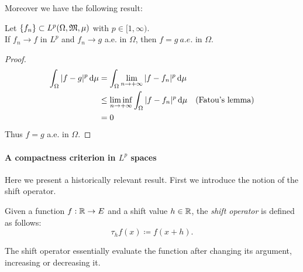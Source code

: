 Moreover we have the following result:

\begin{prop}
	Let $\{f_n\}\subset L^p(\Omega,\mathfrak M,\mu)$ with $p \in [1,\infty)$. \\
	If $f_n \to f$ in $L^p$ and $f_n \to g$ a.e. in $\Omega$, then $f=g \ a.e.$ in $\Omega$.
\end{prop}

\begin{proof}
	\begin{align*}
	\int_\Omega |f-g|^p \, \mathrm d \mu
	&= \int_\Omega \lim\limits_{n\to+\infty}|f-f_n|^p \,\mathrm d \mu\\ 
	&\leq \liminf_{n \to +\infty}\int_\Omega |f-f_n|^p \,\mathrm d \mu & \text{(Fatou's lemma)}\\
	& = 0
	\end{align*}
	Thus $f=g$ a.e. in $\Omega$.
\end{proof}


\paragraph{A compactness criterion in $L^p$ spaces} Here we present a historically relevant result. First we introduce the notion of the shift operator.

\begin{defn}
	Given a function $f : \mathbb R \to E$ and a shift value $h \in \mathbb R$, the \emph{shift operator} is defined as follows:
	$$
	\tau_h f(x) 
	\coloneqq f(x+h)
	.
	$$
\end{defn}

The shift operator essentially evaluate the function after changing its argument, increasing or decreasing it.

